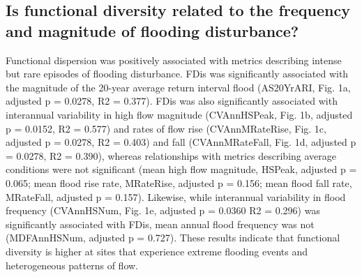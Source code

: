 \documentclass[openright,12pt,a4paper]{memoir}
\begin{document}
\subsection{Is functional diversity related to the frequency and magnitude of flooding disturbance?}
Functional dispersion was positively associated with metrics describing intense but rare episodes of flooding disturbance. FDis was significantly associated with the magnitude of the 20-year average return interval flood (AS20YrARI, Fig. 1a, adjusted p = 0.0278, R2 = 0.377). FDis was also significantly associated with interannual variability in high flow magnitude (CVAnnHSPeak, Fig. 1b, adjusted p = 0.0152, R2 = 0.577) and rates of flow rise (CVAnnMRateRise, Fig. 1c, adjusted p = 0.0278, R2 = 0.403) and fall (CVAnnMRateFall, Fig. 1d, adjusted p = 0.0278, R2 = 0.390), whereas relationships with metrics describing average conditions were not significant (mean high flow magnitude, HSPeak, adjusted p = 0.065; mean flood rise rate, MRateRise, adjusted p = 0.156; mean flood fall rate, MRateFall, adjusted p = 0.157). Likewise, while interannual variability in flood frequency (CVAnnHSNum, Fig. 1e, adjusted p = 0.0360 R2 = 0.296) was significantly associated with FDis, mean annual flood frequency was not (MDFAnnHSNum, adjusted p = 0.727). These results indicate that functional diversity is higher at sites that experience extreme flooding events and heterogeneous patterns of flow.
\end{document}
